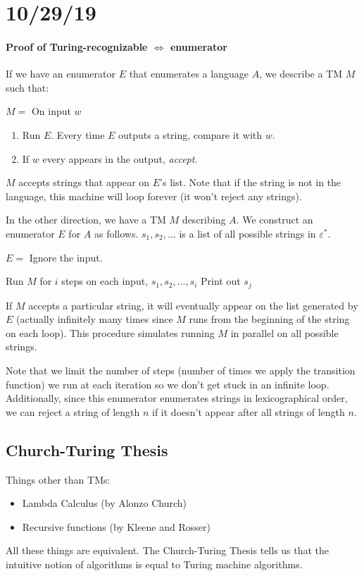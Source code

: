 \documentclass[12 pt]{article}
\begin{document}
\section{10/29/19}
\paragraph{Proof of Turing-recognizable $\iff$ enumerator}
If we have an enumerator $E$ that enumerates a language $A$, we
describe a TM $M$ such that:

$M = $ On input $w$
\begin{enumerate}
\item Run $E$. Every time $E$ outputs a string, compare it with $w$.
\item If $w$ every appears in the output, \textit{accept}.
\end{enumerate}
$M$ accepts strings that appear on $E$'s list. Note that if the string
is not in the language, this machine will loop forever (it won't
reject any strings).

In the other direction, we have a TM $M$ describing $A$. We construct
an enumerator $E$ for $A$ as follows. $s_1, s_2, \ldots$ is a list of
all possible strings in $\varepsilon^*$.

$E = $ Ignore the input.
\begin{algorithmic}
    \State Run $M$ for $i$ steps on each input, $s_1,s_2, \ldots, s_i$
    \State Print out $s_j$
    \EndIf
  \EndFor
\end{algorithmic}
If $M$ accepts a particular string, it will eventually appear on the
list generated by $E$ (actually infinitely many times since $M$ runs
from the beginning of the string on each loop). This procedure
simulates running $M$ in parallel on all possible strings.

Note that we limit the number of steps (number of times we apply the
transition function) we run at each iteration so we
don't get stuck in an infinite loop. Additionally, since this
enumerator enumerates strings in lexicographical order, we can reject
a string of length $n$ if it doesn't appear after all strings of
length $n$.
\subsection{Church-Turing Thesis}
Things other than TMs:
\begin{itemize}
\item Lambda Calculus (by Alonzo Church)
\item Recursive functions (by Kleene and Rosser)
\end{itemize}
All these things are equivalent. The Church-Turing Thesis tells us
that the intuitive notion of algorithms is equal to Turing machine
algorithms.
\end{document}
